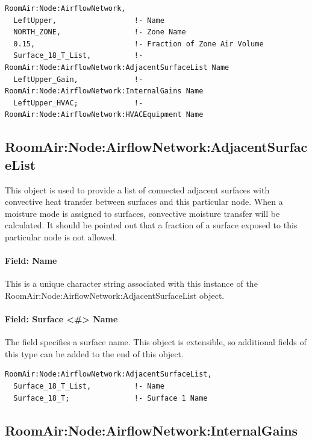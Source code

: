 \begin{lstlisting}
RoomAir:Node:AirflowNetwork,
  LeftUpper,                  !- Name
  NORTH_ZONE,                 !- Zone Name
  0.15,                       !- Fraction of Zone Air Volume
  Surface_18_T_List,          !- RoomAir:Node:AirflowNetwork:AdjacentSurfaceList Name
  LeftUpper_Gain,             !- RoomAir:Node:AirflowNetwork:InternalGains Name
  LeftUpper_HVAC;             !- RoomAir:Node:AirflowNetwork:HVACEquipment Name
\end{lstlisting}

\subsection{RoomAir:Node:AirflowNetwork:AdjacentSurfaceList}\label{roomairnodeairflownetworkadjacentsurfacelist}

This object is used to provide a list of connected adjacent surfaces with convective heat transfer between surfaces and this particular node. When a moisture mode is assigned to surfaces, convective moisture transfer will be calculated. It should be pointed out that a fraction of a surface exposed to this particular node is not allowed.

\paragraph{Field: Name}\label{field-name-9-015}

This is a unique character string associated with this instance of the Room\-Air\-:Node:\-Airflow\-Network:\-Adjacent\-Surface\-List object.

\paragraph{Field: Surface \textless{}\#\textgreater{} Name}\label{field-surface-x-name-000}

The field specifies a surface name. This object is extensible, so additional fields of this type can be added to the end of this object.

\begin{lstlisting}
RoomAir:Node:AirflowNetwork:AdjacentSurfaceList,
  Surface_18_T_List,          !- Name
  Surface_18_T;               !- Surface 1 Name
\end{lstlisting}

\subsection{RoomAir:Node:AirflowNetwork:InternalGains}\label{roomairnodeairflownetworkinternalgains}

